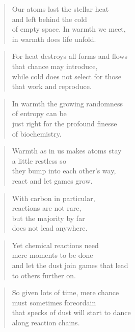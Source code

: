 \documentclass[14pt,a4paper]{article}
\begin{document}
\begin{verse}
Our atoms lost the stellar heat\\
and left behind the cold\\
of empty space. In warmth we meet,\\
in warmth does life unfold.
\end{verse}

\begin{verse}
For heat destroys all forms and flows\\
that chance may introduce,\\
while cold does not select for those\\
that work and reproduce.
\end{verse}

\begin{verse}
In warmth the growing randomness\\
of entropy can be\\
just right for the profound finesse\\
of biochemistry.
\end{verse}

\begin{verse}
Warmth as in us makes atoms stay\\
a little restless so\\
they bump into each other’s way,\\
react and let games grow.
\end{verse}

\begin{verse}
With carbon in particular,\\
reactions are not rare,\\
but the majority by far\\
does not lead anywhere.
\end{verse}

\begin{verse}
Yet chemical reactions need\\
mere moments to be done\\
and let the dust join games that lead\\
to others further on.
\end{verse}

\begin{verse}
So given lots of time, mere chance\\
must sometimes foreordain\\
that specks of dust will start to dance\\
along reaction chains.
\end{verse}
\end{document}
